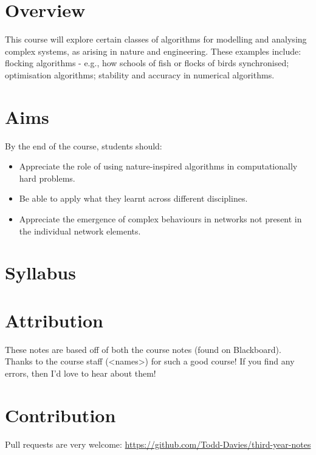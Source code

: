 \section*{Overview}

This course will explore certain classes of algorithms for modelling and
analysing complex systems, as arising in nature and engineering. These examples
include: flocking algorithms - e.g., how schools of fish or flocks of birds
synchronised; optimisation algorithms; stability and accuracy in numerical
algorithms.

\section*{Aims}

By the end of the course, students should:
\begin{itemize}
\item Appreciate the role of using nature-inspired algorithms in
computationally hard problems.
\item Be able to apply what they learnt across different disciplines.
\item Appreciate the emergence of complex behaviours in networks not present in
the individual network elements.
\end{itemize}

\section*{Syllabus}

\section*{Attribution}

These notes are based off of both the course notes (found on Blackboard). Thanks
to the course staff (<names>) for such a good course! If you find any errors,
then I'd love to hear about them!

\section*{Contribution}

Pull requests are very welcome:
\url{https://github.com/Todd-Davies/third-year-notes}